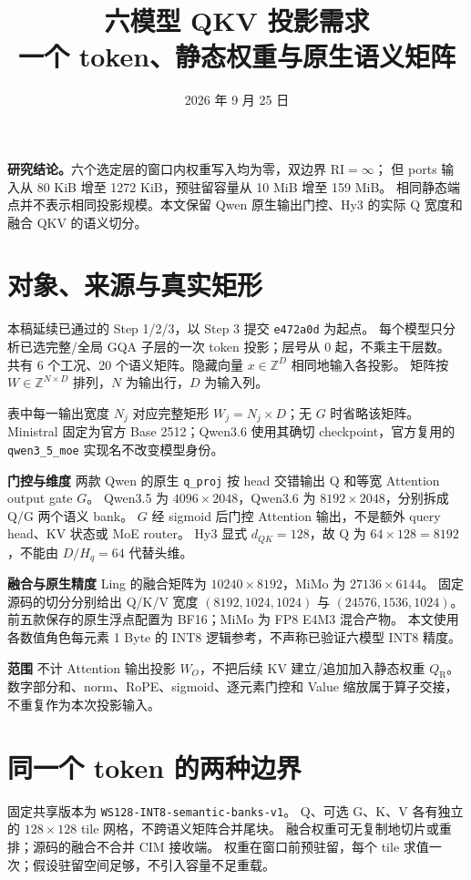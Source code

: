 \documentclass[11pt,a4paper,fontset=fandol]{ctexart}
\title{\bfseries 六模型 QKV 投影需求\\[4pt]\large 一个 token、静态权重与原生语义矩阵}
\author{}\date{2026 年 9 月 25 日}
\newcommand{\qr}{Q_{\mathrm R}}
\newcommand{\RI}{\mathrm{RI}}
\newcommand{\para}[1]{\par\smallskip\noindent\textbf{#1}\quad}
\begin{document}
\maketitle\vspace{-1.6em}
\noindent\textbf{研究结论。}六个选定层的窗口内权重写入均为零，双边界 $\RI=\infty$；
但 ports 输入从 80 KiB 增至 1272 KiB，预驻留容量从 10 MiB 增至 159 MiB。
相同静态端点并不表示相同投影规模。本文保留 Qwen 原生输出门控、Hy3 的实际 Q 宽度和融合 QKV 的语义切分。

\section{对象、来源与真实矩形}
本稿延续已通过的 Step 1/2/3，以 Step 3 提交 \texttt{e472a0d} 为起点。
每个模型只分析已选完整/全局 GQA 子层的一次 token 投影；层号从 0 起，不乘主干层数。
共有 6 个工况、20 个语义矩阵。隐藏向量 $x\in\mathbb{Z}^{D}$ 相同地输入各投影。
矩阵按 $W\in\mathbb{Z}^{N\times D}$ 排列，$N$ 为输出行，$D$ 为输入列。

\begin{center}\scriptsize

\end{center}
\noindent 表中每一输出宽度 $N_j$ 对应完整矩形 $W_j=N_j\times D$；无 $G$ 时省略该矩阵。
Ministral 固定为官方 Base 2512；Qwen3.6 使用其确切 checkpoint，官方复用的 \texttt{qwen3\_5\_moe} 实现名不改变模型身份。

\para{门控与维度}
两款 Qwen 的原生 \texttt{q\_proj} 按 head 交错输出 Q 和等宽 Attention output gate $G$。
Qwen3.5 为 $4096\times2048$，Qwen3.6 为 $8192\times2048$，分别拆成 Q/G 两个语义 bank。
$G$ 经 sigmoid 后门控 Attention 输出，不是额外 query head、KV 状态或 MoE router。
Hy3 显式 $d_{QK}=128$，故 Q 为 $64\times128=8192$，不能由 $D/H_q=64$ 代替头维。

\para{融合与原生精度}
Ling 的融合矩阵为 $10240\times8192$，MiMo 为 $27136\times6144$。
固定源码的切分分别给出 Q/K/V 宽度 $(8192,1024,1024)$ 与 $(24576,1536,1024)$。
前五款保存的原生浮点配置为 BF16；MiMo 为 FP8 E4M3 混合产物。
本文使用各数值角色每元素 1 Byte 的 INT8 逻辑参考，不声称已验证六模型 INT8 精度。

\para{范围}
不计 Attention 输出投影 $W_O$，不把后续 KV 建立/追加加入静态权重 $\qr$。
数字部分和、norm、RoPE、sigmoid、逐元素门控和 Value 缩放属于算子交接，不重复作为本次投影输入。

\clearpage
\section{同一个 token 的两种边界}
固定共享版本为 \texttt{WS128-INT8-semantic-banks-v1}。
Q、可选 G、K、V 各有独立的 $128\times128$ tile 网格，不跨语义矩阵合并尾块。
融合权重可无复制地切片或重排；源码的融合不合并 CIM 接收端。
权重在窗口前预驻留，每个 tile 求值一次；假设驻留空间足够，不引入容量不足重载。
\end{document}
